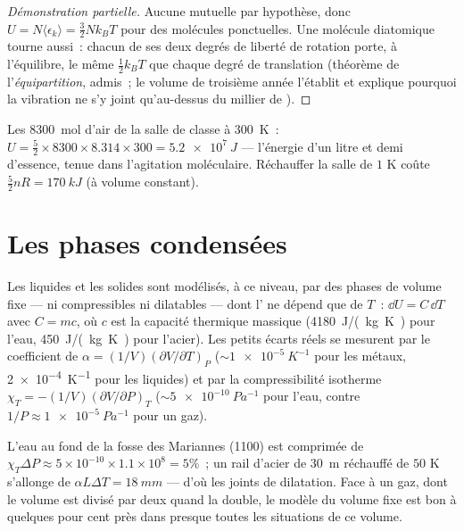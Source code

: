 \begin{proof}[Démonstration partielle]
Aucune  mutuelle par hypothèse, donc $U = N\langle\epsilon_k\rangle
= \tfrac32 Nk_BT$ pour des molécules ponctuelles. Une molécule diatomique
tourne aussi~: chacun de ses deux degrés de liberté de rotation porte, à
l'équilibre, le même $\tfrac12 k_BT$ que chaque degré de translation
(théorème de l'\emph{équipartition}, admis~; le volume de troisième année
l'établit et explique pourquoi la vibration ne s'y joint qu'au-dessus du
millier de ).
\end{proof}

\begin{example}\label{ex:b1:kinetic-theory:room}
Les \qty{8300}{mol} d'air de la salle de classe à \qty{300}{K}~: $U = \tfrac52 \times
8300 \times 8.314 \times 300 = \qty{5.2e7}{J}$ --- l'énergie d'un litre et
demi d'essence, tenue dans l'agitation moléculaire. Réchauffer la salle
de $1$ K coûte $\tfrac52 nR = \qty{170}{kJ}$ (à volume constant).
\end{example}

\section{Les phases condensées}

\begin{proposition}\label{prop:b1:kinetic-theory:condensed}
Les liquides et les solides sont modélisés, à ce niveau, par des phases
de volume fixe --- ni compressibles ni dilatables --- dont l' ne dépend que de $T$~: $\dd U = C\,\dd T$ avec $C = mc$, où $c$
est la capacité thermique massique (\qty{4180}{J/(kg.K)} pour l'eau,
\qty{450}{J/(kg.K)} pour l'acier). Les petits écarts réels se mesurent
par le coefficient de 
$\alpha = (1/V)(\partial V/\partial T)_P$ ($\sim\qty{1e-5}{K^{-1}}$ pour
les métaux, \qty{2e-4}{K^{-1}} pour les liquides) et par la
compressibilité isotherme $\chi_T = -(1/V)(\partial V/\partial P)_T$
($\sim\qty{5e-10}{Pa^{-1}}$ pour l'eau, contre
$1/P \approx \qty{1e-5}{Pa^{-1}}$ pour un gaz).
\end{proposition}
\admitted

\begin{example}\label{ex:b1:kinetic-theory:water}
L'eau au fond de la fosse des Mariannes (\qty{1100}{}) est comprimée
de $\chi_T\Delta P \approx 5\times10^{-10} \times 1.1\times10^8 = 5\%$~; un
rail d'acier de \qty{30}{m} réchauffé de $50$ K s'allonge de $\alpha L\Delta T =
\qty{18}{mm}$ --- d'où les joints de dilatation. Face à un gaz, dont le
volume est divisé par deux quand la  double, le modèle du volume
fixe est bon à quelques pour cent près dans presque toutes les
situations de ce volume.
\end{example}

